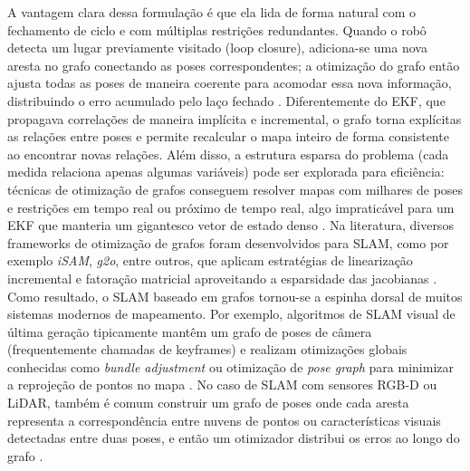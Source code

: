         A vantagem clara dessa formulação é que ela lida de forma natural com o fechamento de ciclo e com múltiplas restrições redundantes. Quando o robô detecta um lugar previamente visitado (loop closure), adiciona-se uma nova aresta no grafo conectando as poses correspondentes; a otimização do grafo então ajusta todas as poses de maneira coerente para acomodar essa nova informação, distribuindo o erro acumulado pelo laço fechado \cite{Labbe2014}. Diferentemente do EKF, que propagava correlações de maneira implícita e incremental, o grafo torna explícitas as relações entre poses e permite recalcular o mapa inteiro de forma consistente ao encontrar novas relações. Além disso, a estrutura esparsa do problema (cada medida relaciona apenas algumas variáveis) pode ser explorada para eficiência: técnicas de otimização de grafos conseguem resolver mapas com milhares de poses e restrições em tempo real ou próximo de tempo real, algo impraticável para um EKF que manteria um gigantesco vetor de estado denso \cite{Grisetti2010}. Na literatura, diversos frameworks de otimização de grafos foram desenvolvidos para SLAM, como por exemplo \textit{iSAM}, \textit{g2o}, entre outros, que aplicam estratégias de linearização incremental e fatoração matricial aproveitando a esparsidade das jacobianas \cite{Juric2021ASLAM} \cite{Kummerle2017G2o:Optimization} \cite{Kaess2008ISAM:Mapping} \cite{Li2021Gumbel-softmax-basedGraphs}. Como resultado, o SLAM baseado em grafos tornou-se a espinha dorsal de muitos sistemas modernos de mapeamento. Por exemplo, algoritmos de SLAM visual de última geração tipicamente mantêm um grafo de poses de câmera (frequentemente chamadas de keyframes) e realizam otimizações globais conhecidas como \textit{bundle adjustment} ou otimização de \textit{pose graph} para minimizar a reprojeção de pontos no mapa \cite{MurArtal2017}\cite{Zhang2021}. No caso de SLAM com sensores RGB-D ou LiDAR, também é comum construir um grafo de poses onde cada aresta representa a correspondência entre nuvens de pontos ou características visuais detectadas entre duas poses, e então um otimizador distribui os erros ao longo do grafo \cite{Zhang2021}. 
        
